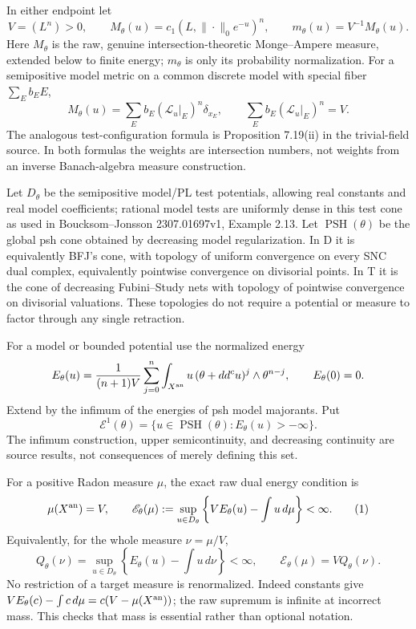 \documentclass[11pt]{article}
\begin{document}
In either endpoint let
\[
 V=(L^n)>0,\qquad M_\theta(u)=c_1(L,\|\cdot\|_0e^{-u})^n,
 \qquad m_\theta(u)=V^{-1}M_\theta(u).
\]
Here \(M_\theta\) is the raw, genuine intersection-theoretic Monge--Ampere measure, extended below to finite energy; \(m_\theta\) is only its probability normalization. For a semipositive model metric on a common discrete model with special fiber \(\sum_E b_EE\),
\[
 M_\theta(u)=\sum_E b_E(\mathcal L_u|_E)^n\delta_{x_E},
 \qquad \sum_E b_E(\mathcal L_u|_E)^n=V.
\]
The analogous test-configuration formula is Proposition 7.19(ii) in the trivial-field source. In both formulas the weights are intersection numbers, not weights from an inverse Banach-algebra measure construction.

Let \(D_\theta\) be the semipositive model/PL test potentials, allowing real constants and real model coefficients; rational model tests are uniformly dense in this test cone as used in Boucksom--Jonsson 2307.01697v1, Example 2.13. Let \(\operatorname{PSH}(\theta)\) be the global psh cone obtained by decreasing model regularization. In D it is equivalently BFJ's cone, with topology of uniform convergence on every SNC dual complex, equivalently pointwise convergence on divisorial points. In T it is the cone of decreasing Fubini--Study nets with topology of pointwise convergence on divisorial valuations. These topologies do not require a potential or measure to factor through any single retraction.

For a model or bounded potential use the normalized energy
\[
 E_\theta(u)=\frac1{(n+1)V}\sum_{j=0}^n
 \int_{X^{\rm an}}u\,(\theta+dd^cu)^j\wedge\theta^{n-j},
 \qquad E_\theta(0)=0.
\]
Extend by the infimum of the energies of psh model majorants. Put
\[
 \mathcal E^1(\theta)=\{u\in\operatorname{PSH}(\theta):E_\theta(u)>-\infty\}.
\]
The infimum construction, upper semicontinuity, and decreasing continuity are source results, not consequences of merely defining this set.

For a positive Radon measure \(\mu\), the exact raw dual energy condition is
\[
 \mu(X^{\rm an})=V,\qquad
 \mathscr E_\theta(\mu):=
 \sup_{u\in D_\theta}\left\{VE_\theta(u)-\int u\,d\mu\right\}<\infty.
 \tag{1}
\]
Equivalently, for the whole measure \(\nu=\mu/V\),
\[
 Q_\theta(\nu)=\sup_{u\in D_\theta}
 \left\{E_\theta(u)-\int u\,d\nu\right\}<\infty,
 \qquad\mathscr E_\theta(\mu)=VQ_\theta(\nu).
 \tag{2}
\]
No restriction of a target measure is renormalized. Indeed constants give \(VE_\theta(c)-\int c\,d\mu=c(V-\mu(X^{\rm an}))\); the raw supremum is infinite at incorrect mass. This checks that mass is essential rather than optional notation.
\end{document}
